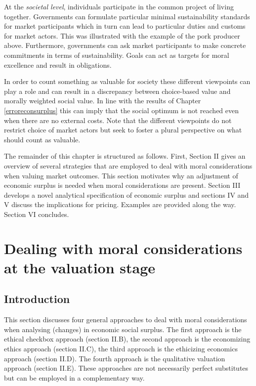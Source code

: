 \documentclass[
]{book}
\begin{document}
At the \emph{societal level}, individuals participate in the common project of living together. Governments can formulate particular minimal sustainability standards for market participants which in turn can lead to particular duties and customs for market actors. This was illustrated with the example of the pork producer above. Furthermore, governments can ask market participants to make concrete commitments in terms of sustainability. Goals can act as targets for moral excellence and result in obligations.

In order to count something as valuable for society these different viewpoints can play a role and can result in a discrepancy between choice-based value and morally weighted social value. In line with the results of Chapter \ref{erroreconsurplus} this can imply that the social optimum is not reached even when there are no external costs. Note that the different viewpoints do not restrict choice of market actors but seek to foster a plural perspective on what should count as valuable.

The remainder of this chapter is structured as follows. First, Section II gives an overview of several strategies that are employed to deal with moral considerations when valuing market outcomes. This section motivates why an adjustment of economic surplus is needed when moral considerations are present. Section III develops a novel analytical specification of economic surplus and sections IV and V discuss the implications for pricing. Examples are provided along the way. Section VI concludes.

\hypertarget{dealing-with-moral-considerations-at-the-valuation-stage}{%
\section{Dealing with moral considerations at the valuation stage}\label{dealing-with-moral-considerations-at-the-valuation-stage}}

\hypertarget{introduction-11}{%
\subsection{Introduction}\label{introduction-11}}

This section discusses four general approaches to deal with moral considerations when analysing (changes) in economic social surplus. The first approach is the ethical checkbox approach (section II.B), the second approach is the economizing ethics approach (section II.C), the third approach is the ethicizing economics approach (section II.D). The fourth approach is the qualitative valuation approach (section II.E). These approaches are not necessarily perfect substitutes but can be employed in a complementary way.
\end{document}
